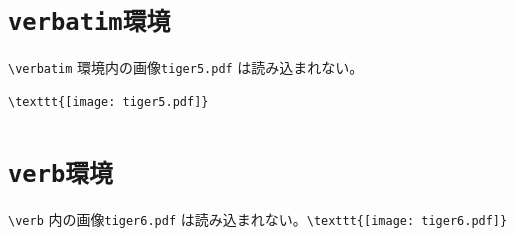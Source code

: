 \documentclass{jsarticle}
\begin{document}
\section{\tt{verbatim}環境}
\verb|\verbatim| 環境内の画像\texttt{tiger5.pdf} は読み込まれない。

\begin{verbatim}
\texttt{[image: tiger5.pdf]}
\end{verbatim}

\section{\tt{verb}環境}
\verb|\verb| 内の画像\texttt{tiger6.pdf} は読み込まれない。\verb|\texttt{[image: tiger6.pdf]}|
\end{document}
